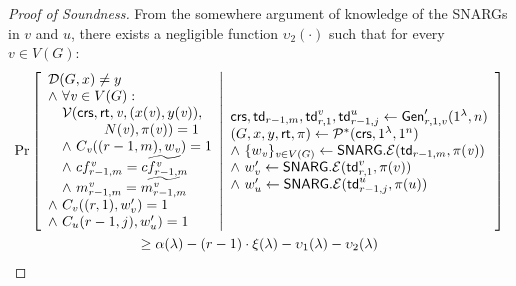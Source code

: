 \begin{proof}[Proof of Soundness]
From the somewhere argument of knowledge of the SNARGs in $v$ and $u$, there exists a negligible function $\upsilon_2(\cdot)$ such that for every $v\in V(G)$:
\begin{gather*}
    \Pr \left[ \begin{array}{ll} 
    \mathcal{D}(G, x)\neq y  \\
    \wedge\ \forall \mathit{ v }\in V(G) : \\
    \quad \mathcal{V}(\mathsf{crs}, \mathsf{rt}, \mathit{ v }, (x(\mathit{ v }), y(\mathit{ v })),\\
    \qquad \qquad N(\mathit{ v }), \pi(\mathit{ v })) = 1 \\
    \quad \wedge ~C_{\mathit{ v }}((r-1, m), w_{\mathit{ v }}) = 1 \\
    \quad \wedge ~cf^{\mathit{ v }}_{r-1, m} = \widetilde{cf^{\mathit{ v }}_{r-1,m}} \\
    \quad \wedge ~m^{\mathit{ v }}_{r-1,m} = \widetilde{m^{\mathit{ v }}_{r-1,m}} \\
    \wedge ~C_v((r,1),w'_v) = 1 \\
    \wedge ~C_{u}(r-1,j),w'_{u}) = 1
     \end{array} \middle\vert \begin{array}{ll} 
    \mathsf{crs}, \mathsf{td}_{r-1,m}, \mathsf{td}^v_{r,1}, \mathsf{td}^{u}_{r-1, j}\leftarrow \mathsf{Gen}'_{r,1,v}(1^\lambda, n) \\
    (G, x, y, \mathsf{rt}, \pi) \leftarrow \mathcal{P}^*(\mathsf{crs}, 1^\lambda, 1^n)\\
    \wedge ~\{w_{\mathit{ v }}\}_{\mathit{ v }\in V(G)}\leftarrow \mathsf{SNARG}.\mathcal{E}(\mathsf{td}_{r-1,m}, \pi(\mathit{ v })) \\
    \wedge ~w'_v\leftarrow \mathsf{SNARG}.\mathcal{E}(\mathsf{td}^v_{r,1}, \pi(v)) \\
    \wedge ~w'_{u}\leftarrow \mathsf{SNARG}.\mathcal{E}(\mathsf{td}^{u}_{r-1,j}, \pi(u))
     \end{array} \right]\\
    \geq \alpha(\lambda) - (r-1)\cdot\xi(\lambda) - \upsilon_1(\lambda) - \upsilon_2(\lambda)
\end{gather*}


\end{proof}
